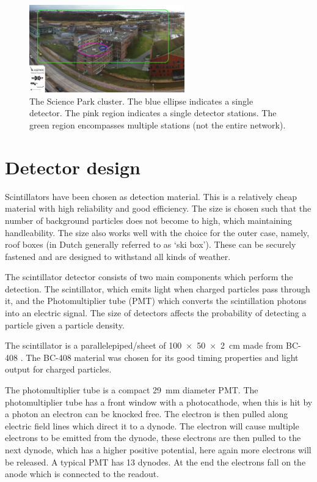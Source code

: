 \begin{figure}
    \centering
    \includegraphics[width=0.6\textwidth]
                    {plots/experiment/ADL_151373_151429_layers}
    \caption{The Science Park cluster. The blue ellipse indicates a single detector. The pink region indicates a single detector stations. The green region encompasses multiple stations (not the entire \hisparc network).}
    \label{fig:sciencepark-layers}
\end{figure}


\section{Detector design}
\label{sec:detector-design}

Scintillators have been chosen as detection material. This is a relatively cheap material with high reliability and good efficiency. The size is chosen such that the number of background particles does not become to high, which maintaining handleability. The size also works well with the choice for the outer case, namely, roof boxes (in Dutch generally referred to as `ski box'). These can be securely fastened and are designed to withstand all kinds of weather.

The scintillator detector consists of two main components which perform the detection. The scintillator, which emits light when charged particles pass through it, and the Photomultiplier tube (PMT) which converts the scintillation photons into an electric signal. The size of detectors affects the probability of detecting a particle given a particle density.

The scintillator is a parallelepiped/sheet of \SI[product-units=power]{100 x 50 x 2}{\centi\meter} made from BC-408 \cite{bc408}. The BC-408 material was chosen for its good timing properties and light output for charged particles.

The photomultiplier tube \cite{et:pmt} is a compact \SI{29}{\milli\meter} diameter PMT. The photomultiplier tube has a front window with a photocathode, when this is hit by a photon an electron can be knocked free. The electron is then pulled along electric field lines which direct it to a dynode. The electron will cause multiple electrons to be emitted from the dynode, these electrons are then pulled to the next dynode, which has a higher positive potential, here again more electrons will be released. A typical PMT has 13 dynodes. At the end the electrons fall on the anode which is connected to the readout.

